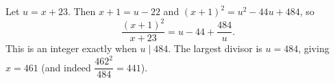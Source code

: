 Let $u=x+23$. Then $x+1=u-22$ and $(x+1)^2=u^2-44u+484$, so
\[
\dfrac{(x+1)^2}{x+23}=u-44+\dfrac{484}{u}.
\]
This is an integer exactly when $u\mid484$. The largest divisor is $u=484$, giving $x=\boxed{461}$ (and indeed $\dfrac{462^2}{484}=441$).
